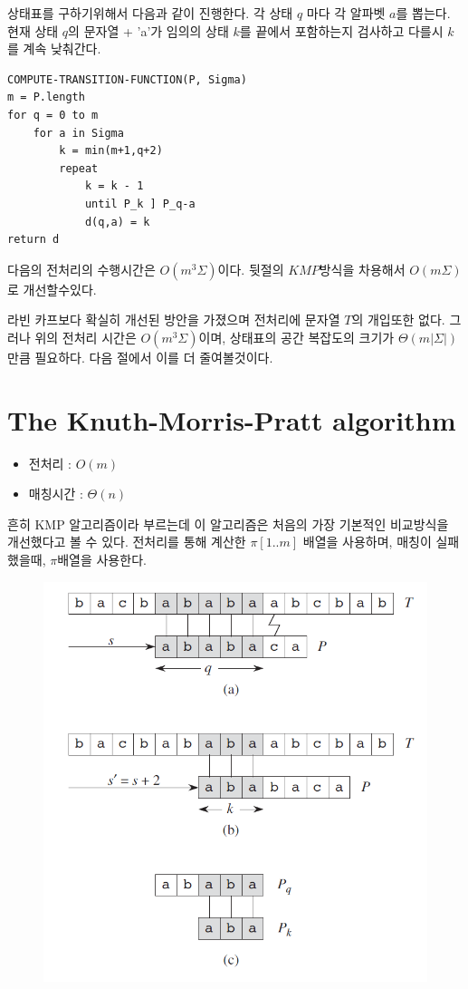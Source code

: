 상태표를 구하기위해서 다음과 같이 진행한다.
각 상태 $q$ 마다 각 알파벳 $a$를 뽑는다.
현재 상태 $q$의 문자열 + 'a'가 임의의 상태 $k$를 끝에서 포함하는지 검사하고 다를시 $k$를 계속 낮춰간다.

\begin{lstlisting}[style = CStyle]
COMPUTE-TRANSITION-FUNCTION(P, Sigma)
m = P.length
for q = 0 to m
    for a in Sigma
        k = min(m+1,q+2)
        repeat 
            k = k - 1
            until P_k ] P_q-a
            d(q,a) = k
return d
\end{lstlisting}



다음의 전처리의 수행시간은  $O(m^3 \Sigma)$이다.
뒷절의 $KMP$방식을 차용해서 $O(m \Sigma)$로 개선할수있다.


라빈 카프보다 확실히 개선된 방안을 가졌으며 전처리에 문자열 $T$의 개입또한 없다. 그러나 위의 전처리 시간은 $O(m^3 \Sigma)$이며, 상태표의 공간 복잡도의 크기가 $\Theta(m|\Sigma|)$만큼 필요하다.
다음 절에서 이를 더 줄여볼것이다.






\section{The Knuth-Morris-Pratt algorithm}

\begin{itemize}
    \item 전처리 : $O(m)$
    \item 매칭시간 : $\Theta(n)$
\end{itemize}


흔히 KMP 알고리즘이라 부르는데 이 알고리즘은 처음의 가장 기본적인 비교방식을 개선했다고 볼 수 있다. 전처리를 통해 계산한 $\pi[1..m]$ 배열을 사용하며, 매칭이 실패했을때, $\pi$배열을 사용한다.
\newpage
\begin{figure}[h!]
    \centering
    \includegraphics[scale=0.7]{./string_matching/pic3.PNG}
\end{figure}

